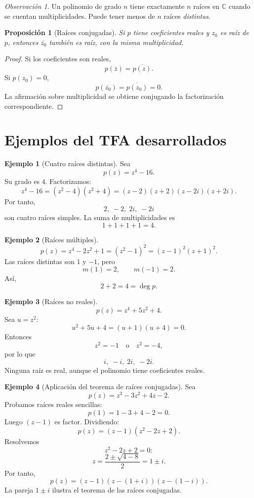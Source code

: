 \documentclass[12pt]{article}
\newtheorem{proposicion}[teorema]{Proposición}
\theoremstyle{definition}
\newtheorem{ejemplo}{Ejemplo}[section]
\theoremstyle{remark}
\newtheorem{observacion}{Observación}[section]
\newcommand{\C}{\mathbb{C}}
\begin{document}
\begin{observacion}
Un polinomio de grado $n$ tiene exactamente $n$ raíces en $\C$ cuando se
cuentan multiplicidades. Puede tener menos de $n$ raíces \emph{distintas}.
\end{observacion}

\begin{proposicion}[Raíces conjugadas]
Si $p$ tiene coeficientes reales y $z_0$ es raíz de $p$, entonces
$\overline{z_0}$ también es raíz, con la misma multiplicidad.
\end{proposicion}

\begin{proof}
Si los coeficientes son reales,
\[
p(\overline z)=\overline{p(z)}.
\]
Si $p(z_0)=0$,
\[
p(\overline{z_0})
=\overline{p(z_0)}
=0.
\]
La afirmación sobre multiplicidad se obtiene conjugando la factorización
correspondiente.
\end{proof}

\section{Ejemplos del TFA desarrollados}

\begin{ejemplo}[Cuatro raíces distintas]
Sea
\[
p(z)=z^4-16.
\]
Su grado es $4$. Factorizamos:
\[
z^4-16=(z^2-4)(z^2+4)
=(z-2)(z+2)(z-2i)(z+2i).
\]
Por tanto,
\[
\boxed{2,\;-2,\;2i,\;-2i}
\]
son cuatro raíces simples. La suma de multiplicidades es
\[
1+1+1+1=4.
\]
\end{ejemplo}

\begin{ejemplo}[Raíces múltiples]
\[
p(z)=z^4-2z^2+1=(z^2-1)^2=(z-1)^2(z+1)^2.
\]
Las raíces distintas son $1$ y $-1$, pero
\[
m(1)=2,\qquad m(-1)=2.
\]
Así,
\[
2+2=4=\deg p.
\]
\end{ejemplo}

\begin{ejemplo}[Raíces no reales]
\[
p(z)=z^4+5z^2+4.
\]
Sea $u=z^2$:
\[
u^2+5u+4=(u+1)(u+4)=0.
\]
Entonces
\[
z^2=-1\quad\text{o}\quad z^2=-4,
\]
por lo que
\[
\boxed{i,\;-i,\;2i,\;-2i.}
\]
Ninguna raíz es real, aunque el polinomio tiene coeficientes reales.
\end{ejemplo}

\begin{ejemplo}[Aplicación del teorema de raíces conjugadas]
Sea
\[
p(z)=z^3-3z^2+4z-2.
\]
Probamos raíces reales sencillas:
\[
p(1)=1-3+4-2=0.
\]
Luego $(z-1)$ es factor. Dividiendo:
\[
p(z)=(z-1)(z^2-2z+2).
\]
Resolvemos
\[
z^2-2z+2=0:
\]
\[
z=\frac{2\pm\sqrt{4-8}}2
=1\pm i.
\]
Por tanto,
\[
\boxed{
p(z)=(z-1)(z-(1+i))(z-(1-i)).
}
\]
La pareja $1\pm i$ ilustra el teorema de las raíces conjugadas.
\end{ejemplo}
\end{document}
